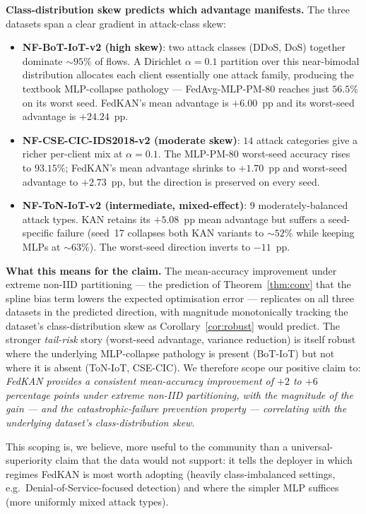 \textbf{Class-distribution skew predicts which advantage manifests.} The three datasets span a clear gradient in attack-class skew:
\begin{itemize}
\item \textbf{NF-BoT-IoT-v2 (high skew)}: two attack classes (DDoS, DoS) together dominate $\sim 95\%$ of flows. A Dirichlet $\alpha = 0.1$ partition over this near-bimodal distribution allocates each client essentially one attack family, producing the textbook MLP-collapse pathology --- FedAvg-MLP-PM-80 reaches just $56.5\%$ on its worst seed. FedKAN's mean advantage is $+6.00$~pp and its worst-seed advantage is $+24.24$~pp.
\item \textbf{NF-CSE-CIC-IDS2018-v2 (moderate skew)}: $14$ attack categories give a richer per-client mix at $\alpha = 0.1$. The MLP-PM-80 worst-seed accuracy rises to $93.15\%$; FedKAN's mean advantage shrinks to $+1.70$~pp and worst-seed advantage to $+2.73$~pp, but the direction is preserved on every seed.
\item \textbf{NF-ToN-IoT-v2 (intermediate, mixed-effect)}: $9$ moderately-balanced attack types. KAN retains its $+5.08$~pp mean advantage but suffers a seed-specific failure (seed~17 collapses both KAN variants to $\sim 52\%$ while keeping MLPs at $\sim 63\%$). The worst-seed direction inverts to $-11$~pp.
\end{itemize}

\textbf{What this means for the claim.} The mean-accuracy improvement under extreme non-IID partitioning --- the prediction of Theorem~\ref{thm:conv} that the spline bias term lowers the expected optimisation error --- replicates on all three datasets in the predicted direction, with magnitude monotonically tracking the dataset's class-distribution skew as Corollary~\ref{cor:robust} would predict. The stronger \emph{tail-risk} story (worst-seed advantage, variance reduction) is itself robust where the underlying MLP-collapse pathology is present (BoT-IoT) but not where it is absent (ToN-IoT, CSE-CIC). We therefore scope our positive claim to: \emph{FedKAN provides a consistent mean-accuracy improvement of $+2$ to $+6$ percentage points under extreme non-IID partitioning, with the magnitude of the gain --- and the catastrophic-failure prevention property --- correlating with the underlying dataset's class-distribution skew}.

This scoping is, we believe, more useful to the community than a universal-superiority claim that the data would not support: it tells the deployer in which regimes FedKAN is most worth adopting (heavily class-imbalanced settings, e.g.\ Denial-of-Service-focused detection) and where the simpler MLP suffices (more uniformly mixed attack types).

